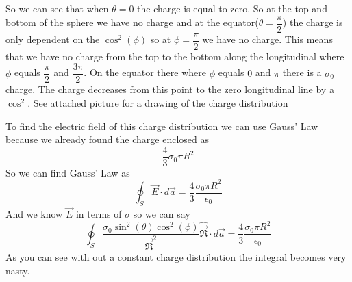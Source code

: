\documentclass[11pt]{article}
\numberwithin{equation}{section}
\newcommand{\vecE}{\vec{E}}
\newcommand{\scrptR}{\vec{\mathfrak{R}}}
\begin{document}
So we can see that when $\theta = 0$ the charge is equal to zero. So at the top and bottom of the sphere we have no charge and at the equator($\theta = \dfrac{\pi}{2}$) the charge is only dependent on the $\cos^2(\phi)$ so at $\phi = \dfrac{\pi}{2}$ we have no charge.
This means that we have no charge from the top to the bottom along the longitudinal where $\phi$ equals $\dfrac{\pi}{2}$ and $\dfrac{3\pi}{2}$. On the equator there where $\phi$ equals $0$ and $\pi$ there is a $\sigma_0$ charge. The charge decreases from this point to the zero longitudinal line by a $\cos^2$. See attached picture for a drawing of the charge distribution 

To find the electric field of this charge distribution we can use Gauss' Law because we already found the charge enclosed as
$$\frac{4}{3}\sigma_0 \pi R^2$$
So we can find Gauss' Law as
$$\oint_S \vec{E}\cdot d\vec{a} = \frac{4}{3}\frac{\sigma_0 \pi R^2}{\epsilon_0}$$
And we know $\vecE$ in terms of $\sigma$ so we can say
$$\oint_S \frac{\sigma_0 \sin^2(\theta)\cos^2(\phi)}{\scrptR^2}\hat{\scrptR}\cdot d\vec{a} = \frac{4}{3}\frac{\sigma_0 \pi R^2}{\epsilon_0}$$
As you can see with out a constant charge distribution the integral becomes very nasty.
\end{document}
